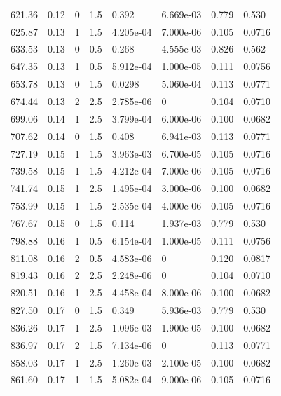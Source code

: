 \documentclass[preview]{standalone}
\begin{document}
{{{\begin{tabular}{L{1.2cm}C{1.2cm} C{0.3cm}C{0.5cm} C{1.4cm}C{1.4cm} C{1.4cm}C{1.4cm}}
  621.36  &  0.12  & 0     & 1.5 &  0.392  & 6.669e-03  & 0.779 &  0.530   \\ 
  625.87  &  0.13  & 1     & 1.5 &  4.205e-04  & 7.000e-06  & 0.105 &  0.0716   \\ 
  633.53  &  0.13  & 0     & 0.5 &  0.268  & 4.555e-03  & 0.826 &  0.562   \\ 
  647.35  &  0.13  & 1     & 0.5 &  5.912e-04  & 1.000e-05  & 0.111 &  0.0756   \\ 
  653.78  &  0.13  & 0     & 1.5 &  0.0298  & 5.060e-04  & 0.113 &  0.0771   \\ 
  674.44  &  0.13  & 2     & 2.5 &  2.785e-06  & 0  & 0.104 &  0.0710   \\ 
  699.06  &  0.14  & 1     & 2.5 &  3.799e-04  & 6.000e-06  & 0.100 &  0.0682   \\ 
  707.62  &  0.14  & 0     & 1.5 &  0.408  & 6.941e-03  & 0.113 &  0.0771   \\ 
  727.19  &  0.15  & 1     & 1.5 &  3.963e-03  & 6.700e-05  & 0.105 &  0.0716   \\ 
  739.58  &  0.15  & 1     & 1.5 &  4.212e-04  & 7.000e-06  & 0.105 &  0.0716   \\ 
  741.74  &  0.15  & 1     & 2.5 &  1.495e-04  & 3.000e-06  & 0.100 &  0.0682   \\ 
  753.99  &  0.15  & 1     & 1.5 &  2.535e-04  & 4.000e-06  & 0.105 &  0.0716   \\ 
  767.67  &  0.15  & 0     & 1.5 &  0.114  & 1.937e-03  & 0.779 &  0.530   \\ 
  798.88  &  0.16  & 1     & 0.5 &  6.154e-04  & 1.000e-05  & 0.111 &  0.0756   \\ 
  811.08  &  0.16  & 2     & 0.5 &  4.583e-06  & 0  & 0.120 &  0.0817   \\ 
  819.43  &  0.16  & 2     & 2.5 &  2.248e-06  & 0  & 0.104 &  0.0710   \\ 
  820.51  &  0.16  & 1     & 2.5 &  4.458e-04  & 8.000e-06  & 0.100 &  0.0682   \\ 
  827.50  &  0.17  & 0     & 1.5 &  0.349  & 5.936e-03  & 0.779 &  0.530   \\ 
  836.26  &  0.17  & 1     & 2.5 &  1.096e-03  & 1.900e-05  & 0.100 &  0.0682   \\ 
  836.97  &  0.17  & 2     & 1.5 &  7.134e-06  & 0  & 0.113 &  0.0771   \\ 
  858.03  &  0.17  & 1     & 2.5 &  1.260e-03  & 2.100e-05  & 0.100 &  0.0682   \\ 
  861.60  &  0.17  & 1     & 1.5 &  5.082e-04  & 9.000e-06  & 0.105 &  0.0716   \\ 

\end{tabular}}}}
\end{document}
